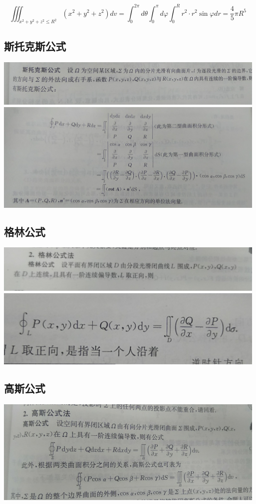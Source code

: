 \documentclass[UTF8]{ctexart}
\begin{document}
$$\iiint_{x^2+y^2+z^2  \leq R^2} (x^2+y^2+z^2)dv=\int_0^{2\pi} d \theta \int_0^\pi d \varphi \int_0^R r^2 \cdot r^2 \sin \varphi dr = \frac{4}{5}\pi R^5 $$

\subsection{斯托克斯公式}
\includegraphics[width=14cm]{9345E7/IMG_20180419_111338.jpg}
\includegraphics[width=14cm]{9345E7/IMG_20180419_111319.jpg}
\subsection{格林公式}
\includegraphics[width=14cm]{9345E7/IMG_20180419_111029.jpg}
\includegraphics[width=14cm]{9345E7/IMG_20180419_111105.jpg}
\subsection{高斯公式}
\includegraphics[width=14cm]{9345E7/IMG_20180419_111223.jpg}
\end{document}
